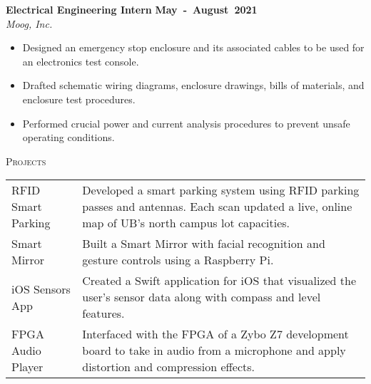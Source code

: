 \documentclass[11pt, a4paper]{article}
\newcommand{\dates}[1]{\hfill\mbox{\textbf{#1}}} %
\newcommand{\headright}[1]{\vspace*{2.5ex}\textsc{\Large\color{cvblue}#1}\par
     \vspace*{-2ex}{\color{cvblue}\hrulefill}\par}
\begin{document}
\begin{minipage}[t]{0.56\textwidth}
\textbf{Electrical Engineering Intern} \dates{May - August 2021} \\
\textit{Moog, Inc.}
\begin{itemize}
    \item Designed an emergency stop enclosure and its associated cables to be used for an electronics test console.
    \item Drafted schematic wiring diagrams, enclosure drawings, bills of materials, and enclosure test procedures.
    \item Performed crucial power and current analysis procedures to prevent unsafe operating conditions.
\end{itemize}

\headright{Projects}
\renewcommand{\arraystretch}{1.3} %
\begin{tabular*}{\textwidth}{@{}>{\raggedright\arraybackslash}p{} @{\hspace{1em}} >{\raggedright\arraybackslash}p{}@{}}
    RFID Smart Parking & Developed a smart parking system using RFID parking passes and antennas. Each scan updated a live, online map of UB's north campus lot capacities.\\
    Smart Mirror & Built a Smart Mirror with facial recognition and gesture controls using a Raspberry Pi. \\
    iOS Sensors App & Created a Swift application for iOS that visualized the user's sensor data along with compass and level features.\\
    FPGA Audio Player & Interfaced with the FPGA of a Zybo Z7 development board to take in audio from a microphone and apply distortion and compression effects.\\
\end{tabular*}

\end{minipage}
\end{document}
